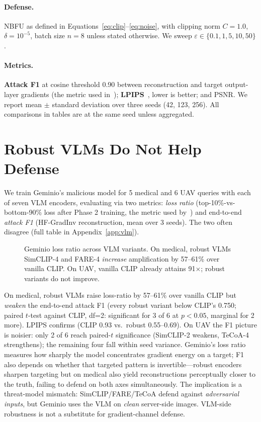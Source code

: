 \documentclass[11pt]{article}
\begin{document}
\paragraph{Defense.}
NBFU as defined in Equations~\ref{eq:clip}--\ref{eq:noise}, with clipping norm $C{=}1.0$, $\delta{=}10^{-5}$, batch size $n{=}8$ unless stated otherwise. We sweep $\varepsilon \in \{0.1, 1, 5, 10, 50\}$.

\paragraph{Metrics.}
\textbf{Attack F1} at cosine threshold 0.90 between reconstruction and target output-layer gradients (the metric used in~\citet{geminio2024}); \textbf{LPIPS}~\citep{lpips2018}, lower is better; and PSNR. We report mean $\pm$ standard deviation over three seeds (42, 123, 256). All comparisons in tables are at the same seed unless aggregated.


\section{Robust VLMs Do Not Help Defense}
\label{sec:vlm}

We train Geminio's malicious model for 5 medical and 6 UAV queries with each of seven VLM encoders, evaluating via two metrics: \emph{loss ratio} (top-10\%-vs-bottom-90\% loss after Phase 2 training, the metric used by~\citet{geminio2024}) and end-to-end \emph{attack F1} (HF-GradInv reconstruction, mean over 3 seeds). The two often disagree (full table in Appendix~\ref{app:vlm}).

\begin{figure}[t]
\centering

\caption{Geminio loss ratio across VLM variants. On medical, robust VLMs SimCLIP-4 and FARE-4 \emph{increase} amplification by 57--61\% over vanilla CLIP. On UAV, vanilla CLIP already attains 91$\times$; robust variants do not improve.}
\label{fig:vlm}
\end{figure}

On medical, robust VLMs raise loss-ratio by 57--61\% over vanilla CLIP but \emph{weaken} the end-to-end attack F1 (every robust variant below CLIP's 0.750; paired $t$-test against CLIP, df=2: significant for 3 of 6 at $p\!<\!0.05$, marginal for 2 more). LPIPS confirms (CLIP 0.93 vs.\ robust 0.55--0.69). On UAV the F1 picture is noisier: only 2 of 6 reach paired-$t$ significance (SimCLIP-2 weakens, TeCoA-4 strengthens); the remaining four fall within seed variance. Geminio's loss ratio measures how sharply the model concentrates gradient energy on a target; F1 also depends on whether that targeted pattern is invertible---robust encoders sharpen targeting but on medical also yield reconstructions perceptually closer to the truth, failing to defend on both axes simultaneously. The implication is a threat-model mismatch: SimCLIP/FARE/TeCoA defend against \emph{adversarial inputs}, but Geminio uses the VLM on \emph{clean} server-side images. VLM-side robustness is not a substitute for gradient-channel defense.
\end{document}
